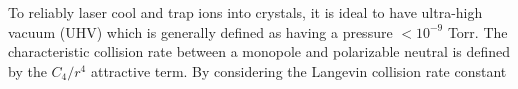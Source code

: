 To reliably laser cool and trap ions into crystals, it is ideal to have ultra-high vacuum (UHV) which is generally defined as having a pressure $<10^{-9}$ Torr. The characteristic collision rate between a monopole and polarizable neutral is defined by the $C_4/r^4$ attractive term. By considering the Langevin collision rate constant 